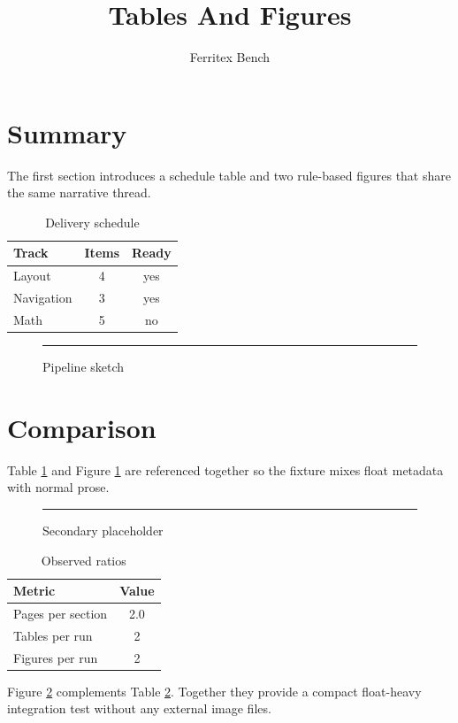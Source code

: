 \documentclass{article}
\title{Tables And Figures}
\author{Ferritex Bench}
\begin{document}
\maketitle
\tableofcontents

\section{Summary}
The first section introduces a schedule table and two rule-based figures that share the same narrative thread.

\begin{table}[h]
\caption{Delivery schedule}
\label{tab:schedule}
\begin{tabular}{|l|c|c|}
\hline
Track & Items & Ready \\
\hline
Layout & 4 & yes \\
Navigation & 3 & yes \\
Math & 5 & no \\
\hline
\end{tabular}
\end{table}

\begin{figure}[h]
\begin{center}
\rule{4.0in}{1.6in}
\end{center}
\caption{Pipeline sketch}
\label{fig:pipeline}
\end{figure}

\section{Comparison}
Table \ref{tab:schedule} and Figure \ref{fig:pipeline} are referenced together so the fixture mixes float metadata with normal prose.

\begin{figure}[h]
\begin{center}
\rule{3.0in}{1.4in}
\end{center}
\caption{Secondary placeholder}
\label{fig:secondary}
\end{figure}

\begin{table}[h]
\caption{Observed ratios}
\label{tab:ratios}
\begin{tabular}{|l|c|}
\hline
Metric & Value \\
\hline
Pages per section & 2.0 \\
Tables per run & 2 \\
Figures per run & 2 \\
\hline
\end{tabular}
\end{table}

Figure \ref{fig:secondary} complements Table \ref{tab:ratios}. Together they provide a compact float-heavy integration test without any external image files.
\end{document}
